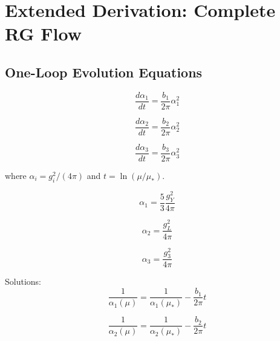 \documentclass[11pt,a4paper]{article}
\theoremstyle{definition}
\begin{document}
\section{Extended Derivation: Complete RG Flow}
\label{app:rg_complete}

\subsection{One-Loop Evolution Equations}
\label{subsec:one_loop}

\begin{equation}
\label{eq:rg_oneloop_1}
\frac{d\alpha_1}{dt} = \frac{b_1}{2\pi}\alpha_1^2
\end{equation}

\begin{equation}
\label{eq:rg_oneloop_2}
\frac{d\alpha_2}{dt} = \frac{b_2}{2\pi}\alpha_2^2
\end{equation}

\begin{equation}
\label{eq:rg_oneloop_3}
\frac{d\alpha_3}{dt} = \frac{b_3}{2\pi}\alpha_3^2
\end{equation}

where $\alpha_i = g_i^2/(4\pi)$ and $t = \ln(\mu/\mu_*)$.

\begin{equation}
\label{eq:alpha_def_1}
\alpha_1 = \frac{5}{3}\frac{g_Y^2}{4\pi}
\end{equation}

\begin{equation}
\label{eq:alpha_def_2}
\alpha_2 = \frac{g_L^2}{4\pi}
\end{equation}

\begin{equation}
\label{eq:alpha_def_3}
\alpha_3 = \frac{g_3^2}{4\pi}
\end{equation}

Solutions:
\begin{equation}
\label{eq:alpha_sol_1}
\frac{1}{\alpha_1(\mu)} = \frac{1}{\alpha_1(\mu_*)} - \frac{b_1}{2\pi}t
\end{equation}

\begin{equation}
\label{eq:alpha_sol_2}
\frac{1}{\alpha_2(\mu)} = \frac{1}{\alpha_2(\mu_*)} - \frac{b_2}{2\pi}t
\end{equation}
\end{document}
